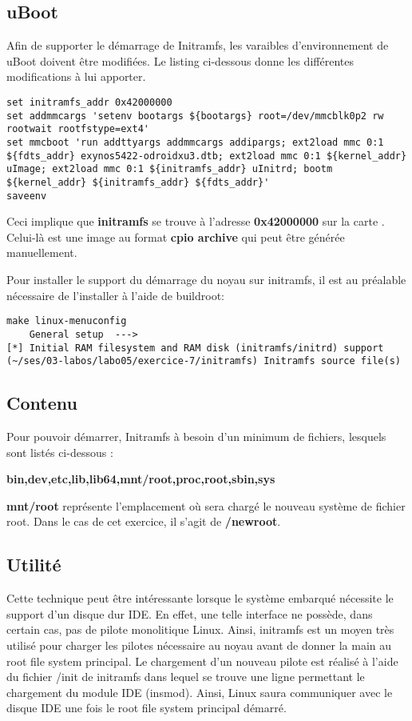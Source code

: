 \subsection{uBoot}
Afin de supporter le démarrage de Initramfs, les varaibles d'environnement de uBoot doivent être modifiées. Le listing ci-dessous donne les différentes modifications à lui apporter.

\begin{lstlisting}
set initramfs_addr 0x42000000
set addmmcargs 'setenv bootargs ${bootargs} root=/dev/mmcblk0p2 rw rootwait rootfstype=ext4'
set mmcboot 'run addttyargs addmmcargs addipargs; ext2load mmc 0:1 ${fdts_addr} exynos5422-odroidxu3.dtb; ext2load mmc 0:1 ${kernel_addr} uImage; ext2load mmc 0:1 ${initramfs_addr} uInitrd; bootm ${kernel_addr} ${initramfs_addr} ${fdts_addr}'
saveenv
\end{lstlisting}
Ceci implique que \textbf{initramfs} se trouve à l'adresse \textbf{0x42000000} sur la carte \usd. Celui-là est une image au format \textbf{cpio archive} qui peut être générée manuellement.

Pour installer le support du démarrage du noyau sur initramfs, il est au préalable nécessaire de l'installer à l'aide de buildroot:
\begin{lstlisting}[style=Bash]
make linux-menuconfig
    General setup  --->
[*] Initial RAM filesystem and RAM disk (initramfs/initrd) support
(~/ses/03-labos/labo05/exercice-7/initramfs) Initramfs source file(s)
\end{lstlisting}

\subsection{Contenu}
Pour pouvoir démarrer, Initramfs à besoin d'un minimum de fichiers, lesquels sont listés ci-dessous :

\textbf{bin,dev,etc,lib,lib64,mnt/root,proc,root,sbin,sys}

\textbf{mnt/root} représente l'emplacement où sera chargé le nouveau système de fichier root. Dans le cas de cet exercice, il s'agit de \textbf{/newroot}.

\subsection{Utilité}
Cette technique peut être intéressante lorsque le système embarqué nécessite le support d'un disque dur IDE. En effet, une telle interface ne possède, dans certain cas, pas de pilote monolitique Linux. Ainsi, initramfs est un moyen très utilisé pour charger les pilotes nécessaire au noyau avant de donner la main au root file system principal. Le chargement d'un nouveau pilote est réalisé à l'aide du fichier /init de initramfs dans lequel se trouve une ligne permettant le chargement du module IDE (insmod). Ainsi, Linux saura communiquer avec le disque IDE une fois le root file system principal démarré.

